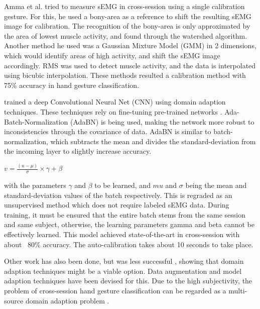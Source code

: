 \documentclass{article}
\begin{document}
Amma et al. \cite{Amma2015} tried to measure sEMG in cross-session using a single calibration gesture. For this, he used a bony-area as a reference to shift the resulting sEMG image for calibration. The recognition of the bony-area is only approximated by the area of lowest muscle activity, and found through the watershed algorithm. Another method he used was a Gaussian Mixture Model (GMM) in 2 dimensions, which would identify areas of high activity, and shift the sEMG image accordingly. RMS was used to detect muscle activity, and the data is interpolated using bicubic interpolation. These methods resulted a calibration method with 75\% accuracy in hand gesture classification. 

\cite{Du2017} trained a deep Convolutional Neural Net (CNN) using domain adaption \cite{Patel2015} techniques. These techniques rely on fine-tuning pre-trained networks \cite{Donahue2014a}. Ada-Batch-Normalization (AdaBN) is being used, making the network more robust to inconsistencies through the covariance of data. AdaBN is similar to batch-normalization, which subtracts the mean and divides the standard-deviation from the incoming layer to slightly increase accuracy.

\begin{center}
\( v = \frac{(u - \mu)}{\sigma} \times \gamma + \beta \)
\end{center}

with the parameters $ \gamma $ and $ \beta $ to be learned, and $ mu $ and $ \sigma $ being the mean and standard-deviation values of the batch respectively. This is regraded as an unsupervised method which does not require labeled sEMG data. During training, it must be ensured that the entire batch stems from the same session and same subject, otherwise, the learning parameters gamma and beta cannot be effectively learned. This model achieved state-of-the-art in cross-session with about ~80\% accuracy. The auto-calibration takes about 10 seconds to take place.

Other work has also been done, but was less successful \cite{Patricia2014a} \cite{Ju2000} \cite{Khushaba2014a}, showing that domain adaption techniques might be a viable option. Data augmentation \cite{Hargrove2008a}  \cite{Boschmann2012} and model adaption techniques \cite{Amma2015} \cite{Patricia2014a} \cite{Ju2000} \cite{Khushaba2014a} have been devised for this. Due to the high subjectivity, the problem of cross-session hand gesture classification can be regarded as a multi-source domain adaption problem \cite{Patel2015}. 
\end{document}
